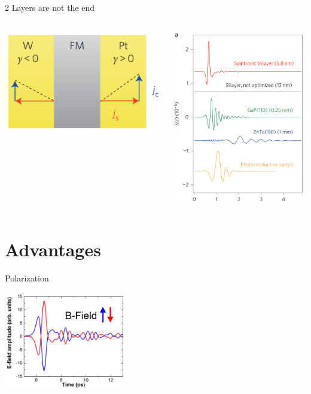 \documentclass[aspectratio=1610, 9pt]{beamer}
\begin{document}
\begin{frame}{2 Layers are not the end}
  \begin{columns}
    \begin{column}{0.5\textwidth}
      \includegraphics[width=.8\textwidth]{pics/trilayer.png}
    \end{column}
    \begin{column}{.5\textwidth}
    \includegraphics[width=.6\textwidth]{pics/vergleich.png}
    \end{column}
  \end{columns}
\end{frame}

\section{Advantages}
\begin{frame}{Polarization}
  \begin{center}
    \includegraphics[width=0.4\textwidth]{pics/Bfeld.png}
  \end{center}
\end{frame}
\end{document}
